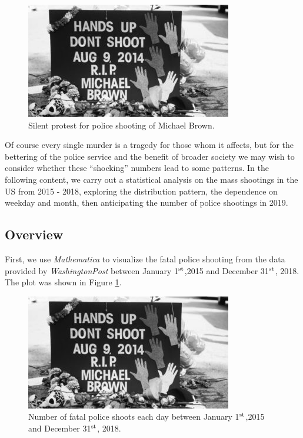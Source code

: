 \documentclass[conf]{new-aiaa}
\begin{document}
\begin{figure}[H]
	\centering
	\includegraphics[width=0.7\linewidth]{intro.png}  
	\caption{Silent protest for police shooting of Michael Brown.}  
\end{figure}

Of course every single murder is a tragedy for those whom it affects, but for the bettering of the police service and the benefit of broader society we may wish to consider whether these ``shocking'' numbers lead to some patterns. In the following content, we carry out a statistical analysis on the mass shootings in the US from 2015 - 2018, exploring the distribution pattern, the dependence on weekday and month, then anticipating the number of police shootings in 2019.

\subsection{Overview}

First, we use \emph{Mathematica} to visualize the fatal police shooting from the data provided by \emph{WashingtonPost}\cite{} between January 1$^{\rm st}$,2015 and December 31$^{\rm st}$, 2018. The plot was shown in Figure \ref{fig:q2}.

\begin{figure}[H]
	\centering
	\includegraphics[width=0.9\linewidth]{intro.png}
	\caption{Number of fatal police shoots each day between January 1$^{\rm st}$,2015 and December 31$^{\rm st}$, 2018.}
	\label{fig:q2}
\end{figure}
\end{document}
